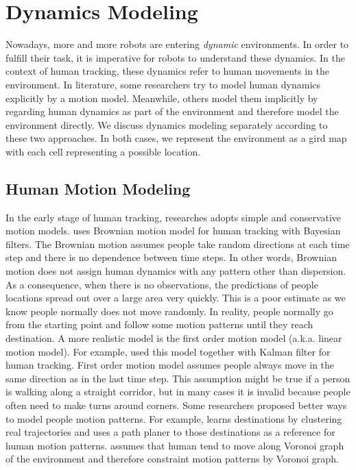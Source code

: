 \section{Dynamics Modeling} \label{lr:dynamic}

Nowadays, more and more robots are entering \textit{dynamic} environments. In order to fulfill their task, it is imperative for robots to understand these dynamics. In the context of human tracking, these dynamics refer to human movements in the environment. In literature, some researchers try to model human dynamics explicitly by a motion model. Meanwhile, others model them implicitly by regarding human dynamics as part of the environment and therefore model the environment directly. We discuss dynamics modeling separately according to these two approaches. In both cases, we represent the environment as a gird map with each cell representing a possible location. 

\subsection{Human Motion Modeling}

In the early stage of human tracking, researches adopts simple and conservative motion models. \citet{montemerlo2002conditional} uses Brownian motion model for human tracking with Bayesian filters.  The Brownian motion assumes people take random directions at each time step and there is no dependence between time steps. In other words, Brownian motion does not assign human dynamics with any pattern other than dispersion. As a consequence, when there is no observations, the predictions of people locations spread out over a large area very quickly. This is a poor estimate as we know people normally does not move randomly. In reality, people normally go from the starting point and follow some motion patterns until they reach destination. A more realistic model is the first order motion model (a.k.a. linear motion model). For example, \citet{meier1999using} used this model together with Kalman filter for human tracking. First order motion model assumes people always move in the same direction as in the last time step. This assumption might be true if a person is walking along a straight corridor, but in many cases it is invalid because people often need to make turns around corners. Some researchers proposed better ways to model people motion patterns. For example, \citet{bruce2004better} learns destinations by clustering real trajectories and uses a path planer to those destinations as a reference for human motion patterns. \citet{liao2003voronoi} assumes that human tend to move along Voronoi graph of the environment and therefore constraint motion patterns by Voronoi graph. 

